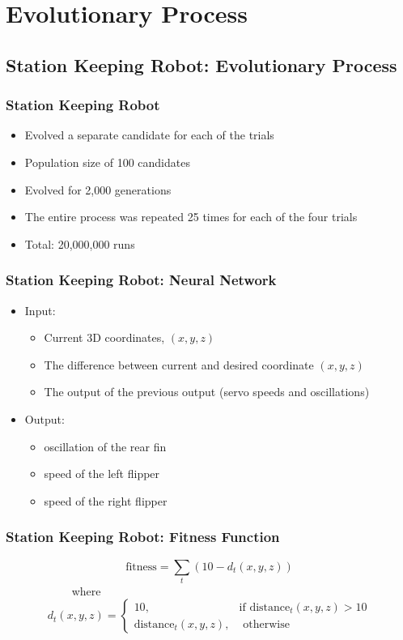\documentclass{beamer}
\begin{document}
\section{Evolutionary Process}

\subsection*{Station Keeping Robot: Evolutionary Process}
\begin{frame}
  \frametitle{Station Keeping Robot}
\begin{itemize}
\item Evolved a separate candidate for each of the trials
\item Population size of 100 candidates
\item Evolved for 2,000 generations
\item The entire process was repeated 25 times for each of the four trials
\item Total: 20,000,000 runs
\end{itemize}
\end{frame}

\begin{frame}
  \frametitle{Station Keeping Robot: Neural Network}
\begin{itemize}
\item Input: 
\begin{itemize}
\item Current 3D coordinates, $(x,y,z)$
\item The difference between current and desired coordinate  $(x,y,z)$
\item The output of the previous output (servo speeds and oscillations)
\end{itemize}
\item Output:
\begin{itemize}
\item oscillation of the rear fin
\item speed of the left flipper
\item speed of the right flipper
\end{itemize}
\end{itemize}
\end{frame}

\begin{frame}
  \frametitle{Station Keeping Robot: Fitness Function}
\begin{equation*}
	\textrm{fitness} = \sum_{t} (10 - d_t(x, y, z))
\end{equation*}
~~~~~~~~~~~  where
\[
	d_t(x, y, z) = 
		\begin{cases} 10, & \textrm{if distance}_t(x, y, z) > 10 \\
					  \textrm{distance}_t(x, y, z), & \textrm{ otherwise}
		\end{cases}
\]
\end{frame}
\end{document}
